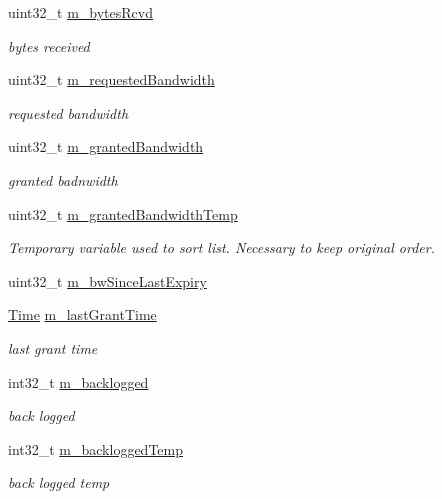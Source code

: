 \begin{DoxyCompactItemize}
uint32\+\_\+t \hyperlink{classns3_1_1ServiceFlowRecord_a599566b4d725dfb1baeb9f540cb4a162}{m\+\_\+bytes\+Rcvd}
\begin{DoxyCompactList}\small\item\em bytes received \end{DoxyCompactList}\item 
uint32\+\_\+t \hyperlink{classns3_1_1ServiceFlowRecord_abb3ef2b08f8535755b0c95a5f3f9674a}{m\+\_\+requested\+Bandwidth}
\begin{DoxyCompactList}\small\item\em requested bandwidth \end{DoxyCompactList}\item 
uint32\+\_\+t \hyperlink{classns3_1_1ServiceFlowRecord_a9133b60b0e9c5a634cff86d2f481b979}{m\+\_\+granted\+Bandwidth}
\begin{DoxyCompactList}\small\item\em granted badnwidth \end{DoxyCompactList}\item 
uint32\+\_\+t \hyperlink{classns3_1_1ServiceFlowRecord_a816fc5c1255af521222258e2c535a282}{m\+\_\+granted\+Bandwidth\+Temp}
\begin{DoxyCompactList}\small\item\em Temporary variable used to sort list. Necessary to keep original order. \end{DoxyCompactList}\item 
uint32\+\_\+t \hyperlink{classns3_1_1ServiceFlowRecord_ac1f0e1c94ddc9bac064a534ed07df9b3}{m\+\_\+bw\+Since\+Last\+Expiry}
\item 
\hyperlink{classns3_1_1Time}{Time} \hyperlink{classns3_1_1ServiceFlowRecord_a7bb8180a67da3ac452bd11ad634b4d0e}{m\+\_\+last\+Grant\+Time}
\begin{DoxyCompactList}\small\item\em last grant time \end{DoxyCompactList}\item 
int32\+\_\+t \hyperlink{classns3_1_1ServiceFlowRecord_a291d1ed393419510681da44213fba707}{m\+\_\+backlogged}
\begin{DoxyCompactList}\small\item\em back logged \end{DoxyCompactList}\item 
int32\+\_\+t \hyperlink{classns3_1_1ServiceFlowRecord_ae87a868de306eba5eebf360c17e41e92}{m\+\_\+backlogged\+Temp}
\begin{DoxyCompactList}\small\item\em back logged temp \end{DoxyCompactList}\end{DoxyCompactItemize}


